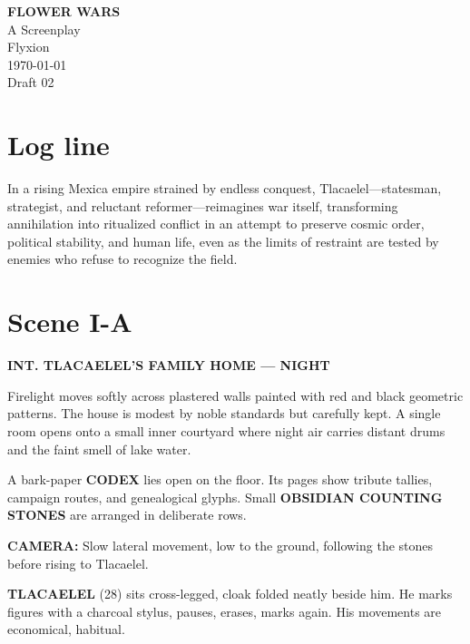 \documentclass[12pt]{article}
\begin{document}
\thispagestyle{empty}

\begin{center}
\vspace*{2.5cm}

{\Large\bfseries FLOWER WARS}\\[1.2cm]

{\normalsize A Screenplay}\\[3.5cm]

{\normalsize
Flyxion\\
\today\\
Draft 02
}

\vfill
\end{center}

\newpage
\section*{Log line}

In a rising Mexica empire strained by endless conquest, Tlacaelel—statesman, strategist, and reluctant reformer—reimagines war itself, transforming annihilation into ritualized conflict in an attempt to preserve cosmic order, political stability, and human life, even as the limits of restraint are tested by enemies who refuse to recognize the field.

\section*{Scene I-A}

\textbf{INT. TLACAELEL’S FAMILY HOME — NIGHT}

Firelight moves softly across plastered walls painted with red and black geometric patterns. The house is modest by noble standards but carefully kept. A single room opens onto a small inner courtyard where night air carries distant drums and the faint smell of lake water.

A bark-paper \textbf{CODEX} lies open on the floor. Its pages show tribute tallies, campaign routes, and genealogical glyphs. Small \textbf{OBSIDIAN COUNTING STONES} are arranged in deliberate rows.

\textbf{CAMERA:} Slow lateral movement, low to the ground, following the stones before rising to Tlacaelel.

\textbf{TLACAELEL} (28) sits cross-legged, cloak folded neatly beside him. He marks figures with a charcoal stylus, pauses, erases, marks again. His movements are economical, habitual.
\end{document}
